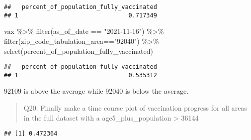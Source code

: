 \documentclass[
]{article}
\newenvironment{Shaded}{\begin{snugshade}}{\end{snugshade}}
\newcommand{\AttributeTok}[1]{\textcolor[rgb]{0.77,0.63,0.00}{#1}}
\newcommand{\ConstantTok}[1]{\textcolor[rgb]{0.00,0.00,0.00}{#1}}
\newcommand{\DecValTok}[1]{\textcolor[rgb]{0.00,0.00,0.81}{#1}}
\newcommand{\FloatTok}[1]{\textcolor[rgb]{0.00,0.00,0.81}{#1}}
\newcommand{\FunctionTok}[1]{\textcolor[rgb]{0.00,0.00,0.00}{#1}}
\newcommand{\NormalTok}[1]{#1}
\newcommand{\OtherTok}[1]{\textcolor[rgb]{0.56,0.35,0.01}{#1}}
\newcommand{\SpecialCharTok}[1]{\textcolor[rgb]{0.00,0.00,0.00}{#1}}
\newcommand{\StringTok}[1]{\textcolor[rgb]{0.31,0.60,0.02}{#1}}
\begin{document}
\begin{verbatim}
##   percent_of_population_fully_vaccinated
## 1                               0.717349
\end{verbatim}

\begin{Shaded}
\begin{Highlighting}[]
\NormalTok{vax }\SpecialCharTok{\%\textgreater{}\%} \FunctionTok{filter}\NormalTok{(as\_of\_date }\SpecialCharTok{==} \StringTok{"2021{-}11{-}16"}\NormalTok{) }\SpecialCharTok{\%\textgreater{}\%}  
  \FunctionTok{filter}\NormalTok{(zip\_code\_tabulation\_area}\SpecialCharTok{==}\StringTok{"92040"}\NormalTok{) }\SpecialCharTok{\%\textgreater{}\%}
  \FunctionTok{select}\NormalTok{(percent\_of\_population\_fully\_vaccinated)}
\end{Highlighting}
\end{Shaded}

\begin{verbatim}
##   percent_of_population_fully_vaccinated
## 1                               0.535312
\end{verbatim}

92109 is above the average while 92040 is below the average.

\begin{quote}
Q20. Finally make a time course plot of vaccination progress for all
areas in the full dataset with a age5\_plus\_population \textgreater{}
36144
\end{quote}

\begin{Shaded}
\end{Shaded}

\begin{verbatim}
## [1] 0.472364
\end{verbatim}
\end{document}

